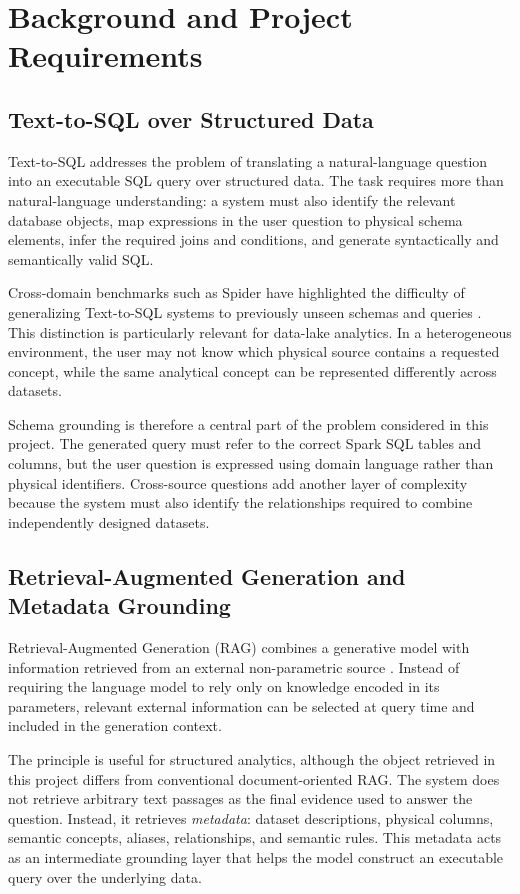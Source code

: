 \section{Background and Project Requirements}
\label{sec:background}


\subsection{Text-to-SQL over Structured Data}

Text-to-SQL addresses the problem of translating a natural-language
question into an executable SQL query over structured data. The task
requires more than natural-language understanding: a system must also
identify the relevant database objects, map expressions in the user
question to physical schema elements, infer the required joins and
conditions, and generate syntactically and semantically valid SQL.

Cross-domain benchmarks such as Spider have highlighted the difficulty
of generalizing Text-to-SQL systems to previously unseen schemas and
queries \cite{yu2018spider}. This distinction is particularly relevant
for data-lake analytics. In a heterogeneous environment, the user may
not know which physical source contains a requested concept, while the
same analytical concept can be represented differently across datasets.

Schema grounding is therefore a central part of the problem considered
in this project. The generated query must refer to the correct Spark SQL
tables and columns, but the user question is expressed using domain
language rather than physical identifiers. Cross-source questions add
another layer of complexity because the system must also identify the
relationships required to combine independently designed datasets.


\subsection{Retrieval-Augmented Generation and Metadata Grounding}

Retrieval-Augmented Generation (RAG) combines a generative model with
information retrieved from an external non-parametric source
\cite{lewis2020rag}. Instead of requiring the language model to rely only
on knowledge encoded in its parameters, relevant external information
can be selected at query time and included in the generation context.

The principle is useful for structured analytics, although the object
retrieved in this project differs from conventional document-oriented
RAG. The system does not retrieve arbitrary text passages as the final
evidence used to answer the question. Instead, it retrieves
\emph{metadata}: dataset descriptions, physical columns, semantic
concepts, aliases, relationships, and semantic rules. This metadata
acts as an intermediate grounding layer that helps the model construct
an executable query over the underlying data.

